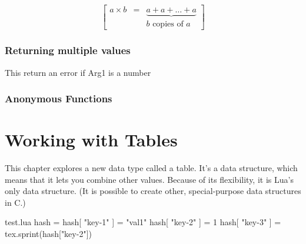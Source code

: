 \documentclass{tufte-book}
\begin{document}
\[
\begin{bmatrix}
   a\times b & = & \underbrace{a+a+\dots+a} \\
   & & b\mbox{ copies of }a
\end{bmatrix} 
\]


\begin{tcblisting}{}
\end{tcblisting}


\subsection{Returning multiple values}
This return an error if Arg1 is a number
\begin{tcblisting}{}
\end{tcblisting}


\begin{tcblisting}{}
\end{tcblisting}

\subsection{Anonymous Functions}
\begin{tcblisting}{}
\end{tcblisting}

\chapter{Working with Tables}
This chapter explores a new data type called a table. It's a data structure, which means that it lets
you combine other values. Because of its flexibility, it is Lua’s only data structure. (It is possible to
create other, special-purpose data structures in C.)
\begin{tcblisting}{}
\begin{filecontents*}{test.lua}
hash = {}
hash[ "key-1" ] = "val1"
hash[ "key-2" ] = 1
hash[ "key-3" ] = {}
tex.sprint(hash["key-2"])
\end{filecontents*}
\end{tcblisting}
\end{document}

